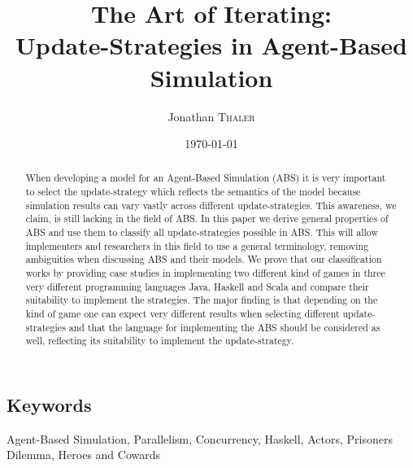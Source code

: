 \documentclass[twocolumn, 10pt]{article}
\title{The Art of Iterating:\\Update-Strategies in Agent-Based Simulation} %
\author{Jonathan \textsc{Thaler}} %
\date{\today} %
\begin{document}
%
\maketitle %

\begin{abstract}
When developing a model for an Agent-Based Simulation (ABS) it is very important to select the update-strategy which reflects the semantics of the model because simulation results can vary vastly across different update-strategies. This awareness, we claim, is still lacking in the field of ABS. In this paper we derive general properties of ABS and use them to classify all update-strategies possible in ABS. This will allow implementers and researchers in this field to use a general terminology, removing ambiguities when discussing ABS and their models. We prove that our classification works by providing case studies in implementing two different kind of games in three very different programming languages Java, Haskell and Scala and compare their suitability to implement the strategies. The major finding is that depending on the kind of game one can expect very different results when selecting different update-strategies and that the language for implementing the ABS should be considered as well, reflecting its suitability to implement the update-strategy.
\end{abstract}

\subsection*{Keywords}
Agent-Based Simulation, Parallelism, Concurrency, Haskell, Actors, Prisoners Dilemma, Heroes and Cowards













\newpage



\end{document}
